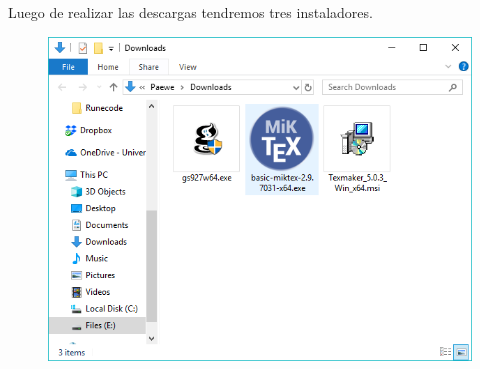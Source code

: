 \documentclass{article}
\begin{document}
\begin{figure}[h!]
  \centering
\end{figure}

\begin{figure}[h!]
  \centering
\end{figure}


Luego de realizar las descargas tendremos tres instaladores.

\begin{figure}[h!]
  \centering
  \includegraphics[scale=0.75]{./imagenes/Installers_latex.png}
\end{figure}
\end{document}
